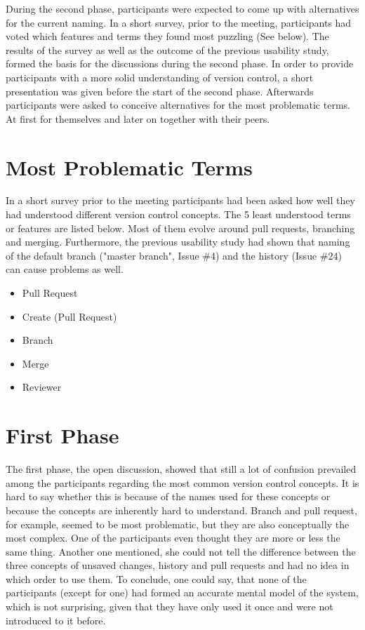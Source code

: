 During the second phase, participants were expected to come up with alternatives for the current naming. In a short survey, prior to the meeting, participants had voted which features and terms they found most puzzling (See below). The results of the survey as well as the outcome of the previous usability study, formed the basis for the discussions during the second phase. In order to provide participants with a more solid understanding of version control, a short presentation was given before the start of the second phase. Afterwards participants were asked to conceive alternatives for the most problematic terms. At first for themselves and later on together with their peers.

\section{Most Problematic Terms}
In a short survey prior to the meeting participants had been asked how well they had understood different version control concepts. The 5 least understood terms or features are listed below. Most of them evolve around pull requests, branching and merging. Furthermore, the previous usability study had shown that naming of the default branch ("master branch", Issue \#4) and the history (Issue \#24) can cause problems as well.

\begin{itemize}
 \item Pull Request
 \item Create (Pull Request)
 \item Branch
 \item Merge
 \item Reviewer
\end{itemize}

\section{First Phase}
The first phase, the open discussion, showed that still a lot of confusion prevailed among the participants regarding the most common version control concepts. It is hard to say whether this is because of the names used for these concepts or because the concepts are inherently hard to understand. Branch and pull request, for example, seemed to be most problematic, but they are also conceptually the most complex. One of the participants even thought they are more or less the same thing. Another one mentioned, she could not tell the difference between the three concepts of unsaved changes, history and pull requests and had no idea in which order to use them. To conclude, one could say, that none of the participants (except for one) had formed an accurate mental model of the system, which is not surprising, given that they have only used it once and were not introduced to it before.


